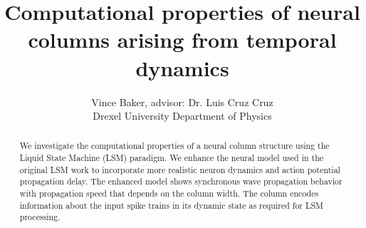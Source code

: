 \documentclass[a4paper,11pt]{article}
\title{Computational properties of neural columns arising from temporal dynamics}
\author{Vince Baker, advisor: Dr. Luis Cruz Cruz\\ Drexel University Department of Physics}
\begin{document}
\maketitle

\begin{abstract}
We investigate the computational properties of a neural column structure using the Liquid State Machine (LSM) paradigm.
We enhance the neural model used in the original LSM work to incorporate more realistic neuron dynamics and action potential propagation delay.
The enhanced model shows synchronous wave propagation behavior with propagation speed that depends on the column width. 
The column encodes information about the input spike trains in its dynamic state as required for LSM processing.

\end{abstract}
\end{document}
